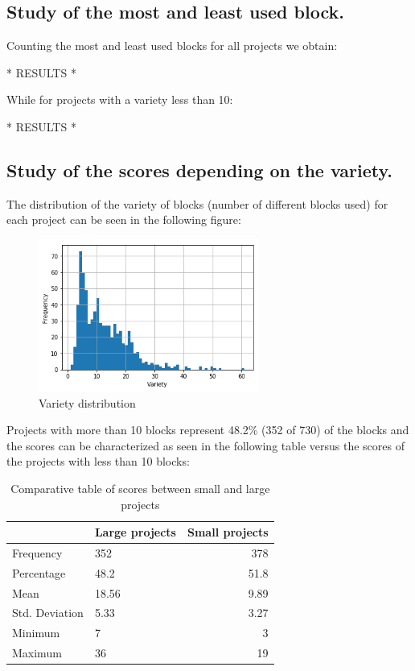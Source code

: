 \documentclass[a4paper]{article}
\begin{document}
\subsection{Study of the most and least used block.}

Counting the most and least used blocks for all projects we obtain:

* RESULTS *

While for projects with a variety less than 10:

* RESULTS *


\subsection{Study of the scores depending on the variety.}

The distribution of the variety of blocks (number of different blocks used) for each project can be seen in the following figure:

\begin{figure}[ht]
\begin{center}
\includegraphics[height=5cm]{fig1}
\caption{Variety distribution }
\label{fig1}
\end{center}
\end{figure}

Projects with more than 10 blocks represent 48.2\% (352 of 730) of the blocks and the scores can be characterized as seen in the following table versus the scores of the projects with less than 10 blocks:

\begin{table}[ht]
\begin{center}
\caption{Comparative table of scores between small and large projects}

\bigskip

\begin{tabular}{|l|l|r|}
\hline
& Large projects & Small projects \\ \hline
Frequency & 352 & 378\\ \hline
Percentage & 48.2 & 51.8\\ \hline
Mean & 18.56 & 9.89\\ \hline
Std. Deviation & 5.33 & 3.27\\ \hline
Minimum & 7 & 3\\ \hline
Maximum & 36 & 19\\ \hline
\end{tabular}
\end{center}
\end{table}
\end{document}
